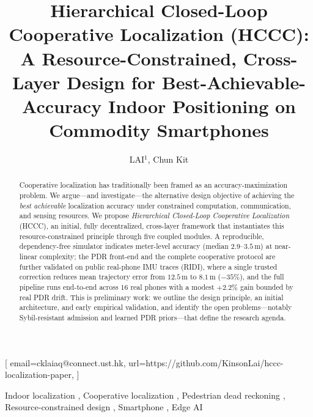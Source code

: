 \documentclass{ceurart}
\theoremstyle{definition}
\begin{document}


\title{Hierarchical Closed-Loop Cooperative Localization (HCCC):\\
  A Resource-Constrained, Cross-Layer Design for
  Best-Achievable-Accuracy Indoor Positioning on Commodity Smartphones}

\author{LAI$^1$, Chun Kit}[%
  email=cklaiaq@connect.ust.hk,
  url=https://github.com/KinsonLai/hccc-localization-paper,
]
\address[1]{Department of Computer Science and Engineering,
  The Hong Kong University of Science and Technology,
  Hong Kong SAR, China}

\begin{abstract}
Cooperative localization has traditionally been framed as an accuracy-maximization
problem. We argue---and investigate---the alternative design objective of achieving
the \emph{best achievable} localization accuracy under constrained computation,
communication, and sensing resources. We propose \emph{Hierarchical Closed-Loop
Cooperative Localization} (HCCC), an initial, fully decentralized, cross-layer
framework that instantiates this resource-constrained principle through five
coupled modules. A reproducible, dependency-free simulator indicates meter-level
accuracy (median $2.9$--$3.5$\,m) at near-linear complexity; the PDR front-end and
the complete cooperative protocol are further validated on public real-phone IMU
traces (RIDI), where a single trusted correction reduces mean trajectory error from
$12.5$\,m to $8.1$\,m ($-35$\%), and the full pipeline runs end-to-end across $16$
real phones with a modest $+2.2$\% gain bounded by real PDR drift. This is
preliminary work: we outline the design principle, an initial architecture, and
early empirical validation, and identify the open problems---notably Sybil-resistant
admission and learned PDR priors---that define the research agenda.
\end{abstract}

\begin{keywords}
Indoor localization \sep
Cooperative localization \sep
Pedestrian dead reckoning \sep
Resource-constrained design \sep
Smartphone \sep
Edge AI
\end{keywords}
\end{document}
